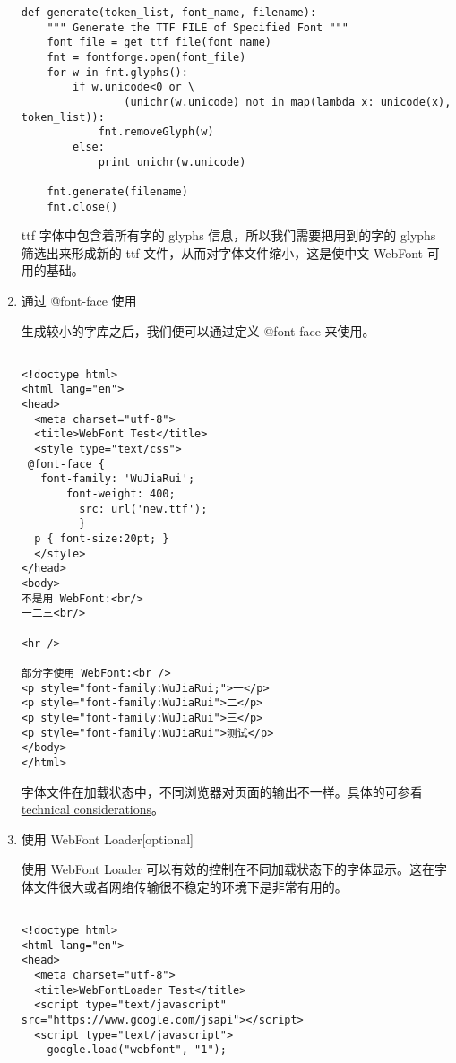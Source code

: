 \documentclass[a4paper,12pt]{report}
\begin{document}
\begin{enumerate}
\begin{verbatim}
def generate(token_list, font_name, filename):
    """ Generate the TTF FILE of Specified Font """
    font_file = get_ttf_file(font_name)
    fnt = fontforge.open(font_file)
    for w in fnt.glyphs():
        if w.unicode<0 or \
                (unichr(w.unicode) not in map(lambda x:_unicode(x), token_list)):
            fnt.removeGlyph(w)
        else:
            print unichr(w.unicode)

    fnt.generate(filename)
    fnt.close()

\end{verbatim}

ttf 字体中包含着所有字的 glyphs 信息，所以我们需要把用到的字的 glyphs 筛选出来形成新的 ttf 文件，从而对字体文件缩小，这是使中文 WebFont 可用的基础。

\item 通过 @font-face 使用

生成较小的字库之后，我们便可以通过定义 @font-face 来使用。

\begin{verbatim}

<!doctype html>
<html lang="en">
<head>
  <meta charset="utf-8">
  <title>WebFont Test</title>
  <style type="text/css">
 @font-face {
   font-family: 'WuJiaRui';
       font-weight: 400;
         src: url('new.ttf');
         }
  p { font-size:20pt; }
  </style>
</head>
<body>
不是用 WebFont:<br/>
一二三<br/>

<hr />

部分字使用 WebFont:<br />
<p style="font-family:WuJiaRui;">一</p>
<p style="font-family:WuJiaRui">二</p>
<p style="font-family:WuJiaRui">三</p>
<p style="font-family:WuJiaRui">测试</p>
</body>
</html>

\end{verbatim}

字体文件在加载状态中，不同浏览器对页面的输出不一样。具体的可参看 \href{https://developers.google.com/webfonts/docs/technical_considerations}{technical considerations}。

\item 使用 WebFont Loader[optional]

使用 WebFont Loader 可以有效的控制在不同加载状态下的字体显示。这在字体文件很大或者网络传输很不稳定的环境下是非常有用的。

\begin{verbatim}

<!doctype html>
<html lang="en">
<head>
  <meta charset="utf-8">
  <title>WebFontLoader Test</title>
  <script type="text/javascript" src="https://www.google.com/jsapi"></script>
  <script type="text/javascript">
    google.load("webfont", "1");


\end{verbatim}
\end{enumerate}
\end{document}
